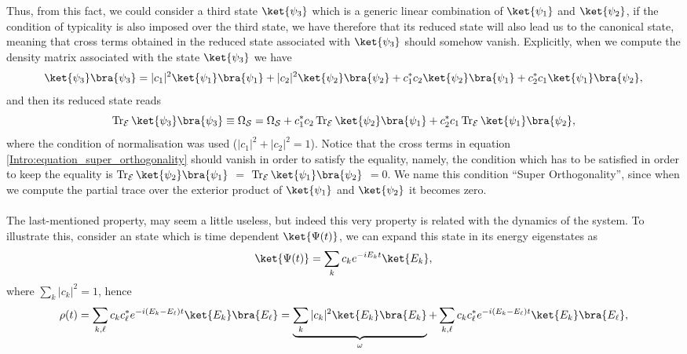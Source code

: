 Thus, from this fact, we could consider a third state $\ket{\psi_3}$ which is a generic linear combination of $\ket{\psi_1}$ and $\ket{\psi_2}$, if the condition of typicality is also imposed over the third state, we have therefore that its reduced state will also lead us to the canonical state, meaning that cross terms obtained in the reduced state associated with $\ket{\psi_3}$ should somehow vanish. Explicitly, when we compute the density matrix associated with the state $\ket{\psi_3}$ we have 
\begin{equation}
\ket{\psi_3}\bra{\psi_3} = |c_1|^2 \ket{\psi_1}\bra{\psi_1} + |c_2|^2 \ket{\psi_2}\bra{\psi_2}+c_1^*c_2\ket{\psi_2}\bra{\psi_1} + c_2^*c_1\ket{\psi_1}\bra{\psi_2},
\end{equation}
and then its reduced state reads
\begin{equation}
\operatorname{Tr}_{\mathcal{E}}\ket{\psi_3}\bra{\psi_3} \equiv \Omega_{\mathcal{S}}= \Omega_{\mathcal{S}}+c_1^*c_2\operatorname{Tr}_{\mathcal{E}}\ket{\psi_2}\bra{\psi_1} + c_2^*c_1\operatorname{Tr}_{\mathcal{E}}\ket{\psi_1}\bra{\psi_2},
\label{Intro:equation_super_orthogonality}
\end{equation}
where the condition of normalisation was used ($|c_1|^2 + |c_2|^2 =1$). Notice that the cross terms in equation \eqref{Intro:equation_super_orthogonality} should vanish in order to satisfy the equality, namely, the condition which has to be satisfied in order to keep the equality is $\operatorname{Tr}_{\mathcal{E}}\ket{\psi_2}\bra{\psi_1}$ $=$ $\operatorname{Tr}_{\mathcal{E}}\ket{\psi_1}\bra{\psi_2}$ $=0$.  We name this condition ``Super Orthogonality'', since when we compute the partial trace over the exterior product of $\ket{\psi_1}$ and $\ket{\psi_2}$ it becomes zero.\\\\
\indent The last-mentioned property, may seem a little useless, but indeed this very property is related with the dynamics of the system. To illustrate this, consider an state which is time dependent $\ket{\Psi(t)}$, we can expand this state in its energy eigenstates as
\begin{equation}
\ket{\Psi(t)}=\sum_{k} c_k e^{-iE_kt}\ket{E_k},
\end{equation}
where $\sum_k|c_k|^2=1$, hence
\begin{equation}
\rho(t) = \sum_{ k,\ell}c_kc^*_\ell e^{-i(E_k-E_\ell)t}\ket{E_k}\bra{E_\ell} = \underbrace{\sum_{ k}|c_k|^2 \ket{E_k}\bra{E_k}}_{\omega}+\sum_{ k,\ell}c_kc^*_\ell e^{-i(E_k-E_\ell)t}\ket{E_k}\bra{E_\ell},
\end{equation}
